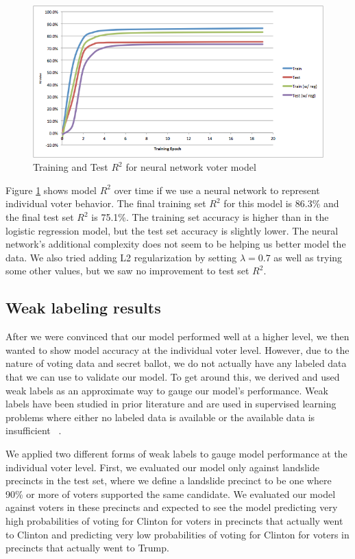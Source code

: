 \documentclass[10pt,twocolumn,letterpaper]{article}
\begin{document}
\begin{figure}[H]
\begin{center}
\includegraphics[scale=0.35]{holdout-R2-neural}
\end{center}
\caption{Training and Test $R^2$ for neural network voter model}
\label{fig:holdout-R2-neural}
\end{figure}

Figure \ref{fig:holdout-R2-neural} shows model $R^2$ over time if we use a neural network to represent individual voter behavior. The final training set $R^2$ for this model is 86.3\% and the final test set $R^2$ is 75.1\%. The training set accuracy is higher than in the logistic regression model, but the test set accuracy is slightly lower. The neural network's additional complexity does not seem to be helping us better model the data. We also tried adding L2 regularization by setting $\lambda = 0.7$ as well as trying some other values, but we saw no improvement to test set $R^2$.

\subsection{Weak labeling results}

After we were convinced that our model performed well at a higher level, we then wanted to show model accuracy at the individual voter level. However, due to the nature of voting data and secret ballot, we do not actually have any labeled data that we can use to validate our model. To get around this, we derived and used weak labels as an approximate way to gauge our model's performance. Weak labels have been studied in prior literature and are used in supervised learning problems where either no labeled data is available or the available data is insufficient ~\cite{rbvr2017}.

We applied two different forms of weak labels to gauge model performance at the individual voter level. First, we evaluated our model only against landslide precincts in the test set, where we define a landslide precinct to be one where 90\% or more of voters supported the same candidate. We evaluated our model against voters in these precincts and expected to see the model predicting very high probabilities of voting for Clinton for voters in precincts that actually went to Clinton and predicting very low probabilities of voting for Clinton for voters in precincts that actually went to Trump.
\end{document}

